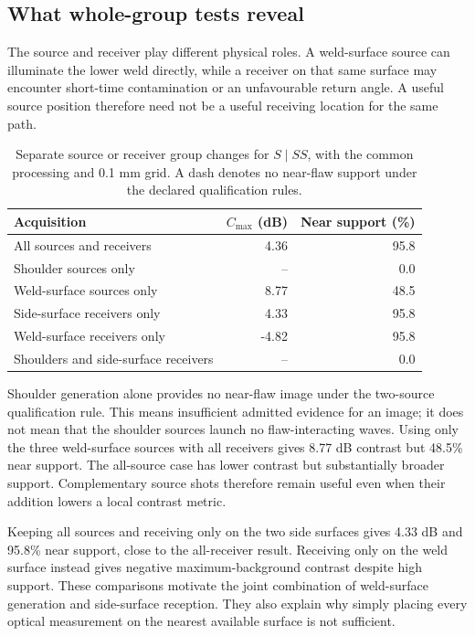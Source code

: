 \subsection{What whole-group tests reveal}
The source and receiver play different physical roles. A weld-surface source can illuminate the lower weld directly, while a receiver on that same surface may encounter short-time contamination or an unfavourable return angle. A useful source position therefore need not be a useful receiving location for the same path.

\begin{table}[!htbp]\centering\small
\caption{Separate source or receiver group changes for $S\mid SS$, with the common processing and 0.1 mm grid. A dash denotes no near-flaw support under the declared qualification rules.}
\begin{tabularx}{\linewidth}{@{}Xrr@{}}\toprule
Acquisition & $C_{\max}$ (dB) & Near support (\%)\\\midrule
All sources and receivers & 4.36 & 95.8 \\
Shoulder sources only & -- & 0.0 \\
Weld-surface sources only & 8.77 & 48.5 \\
Side-surface receivers only & 4.33 & 95.8 \\
Weld-surface receivers only & -4.82 & 95.8 \\
Shoulders and side-surface receivers & -- & 0.0 \\

\bottomrule\end{tabularx}
\label{saftapp:archive:partial:groups}
\end{table}

Shoulder generation alone provides no near-flaw image under the two-source qualification rule. This means insufficient admitted evidence for an image; it does not mean that the shoulder sources launch no flaw-interacting waves. Using only the three weld-surface sources with all receivers gives 8.77 dB contrast but 48.5\% near support. The all-source case has lower contrast but substantially broader support. Complementary source shots therefore remain useful even when their addition lowers a local contrast metric.

Keeping all sources and receiving only on the two side surfaces gives 4.33 dB and 95.8\% near support, close to the all-receiver result. Receiving only on the weld surface instead gives negative maximum-background contrast despite high support. These comparisons motivate the joint combination of weld-surface generation and side-surface reception. They also explain why simply placing every optical measurement on the nearest available surface is not sufficient.

